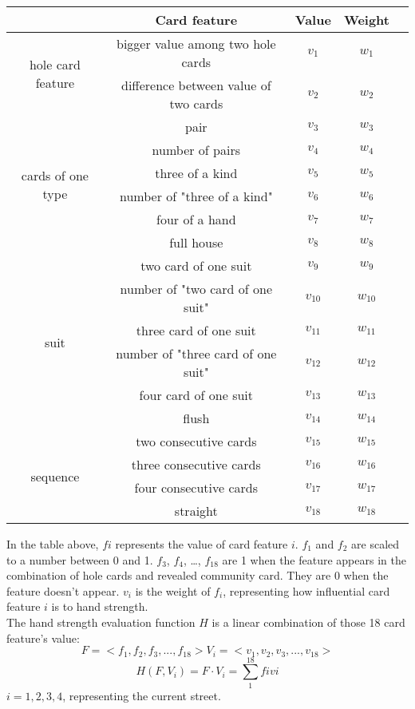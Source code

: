 \documentclass{article}
\begin{document}
\begin{center}
	\begin{tabular}{ |c|c|c|c|c|} 
		\hline
		 & Card feature & Value & Weight \\
		\hline
		 \multirow {2}{*}{hole card feature} & bigger value among two hole cards & $v_1$ & $w_1$\\ 
		& difference between value of two cards & $v_2$ &$w_2$\\ 
		\hline
		\multirow{6}{*}{cards of one type}& pair & $v_3$ & $w_3$\\ 
		& number of pairs & $v_4$ & $w_4$\\ 
		& three of a kind & $v_5$ & $w_5$\\ 
		& number of "three of a kind" & $v_6$ & $w_6$\\ 
		& four of a hand & $v_7$ & $w_7$\\ 
		& full house & $v_8$ & $w_8$\\ 
		\hline
		\multirow{6}{*}{suit}& two card of one suit  & $v_9$ & $w_9$\\ 
		& number of "two card of one suit" & $v_{10}$ & $w_{10}$\\ 
		& three card of one suit  & $v_{11}$ & $w_{11}$\\ 
		& number of "three card of one suit"  & $v_{12}$ & $w_{12}$\\ 
		& four card of one suit  & $v_{13}$ & $w_{13}$\\ 
		& flush  & $v_{14}$ & $w_{14}$\\ 
		\hline
		\multirow{4}{*}{sequence}& two consecutive cards & $v_{15}$ & $w_{15}$\\ 
		& three consecutive cards & $v_{16}$ & $w_{16}$\\ 
		& four consecutive cards & $v_{17}$ & $w_{17}$\\ 
		& straight & $v_{18}$ & $w_{18}$\\ 
		\hline
	\end{tabular}
\end{center}
In the table above, $fi$ represents the value of card feature $i$. $f_1$ and $f_2$ are scaled to a number between 0 and 1. $f_3$, $f_4$, …, $f_{18}$ are 1 when the feature appears in the combination of hole cards and revealed community card. They are 0 when the feature doesn’t appear. $v_i$ is the weight of $f_i$, representing how influential card feature $i$ is to hand strength.
\\The hand strength evaluation function $H$ is a linear combination of those 18 card feature’s value: \[F=<f_1, f_2, f_3, ..., f_{18}> V_i=<v_1, v_2, v_3, ..., v_{18}>\]\[H(F, V_i)=F\cdot V_i=\sum_{1}^{18}fivi\] $i=1, 2, 3, 4$, representing the current street.
\end{document}
